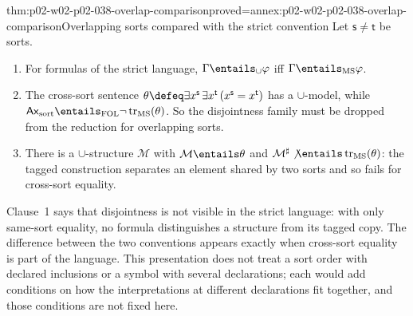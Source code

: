 \begin{hbtheorem}{thm:p02-w02-p02-038-overlap-comparison}{proved=annex:p02-w02-p02-038-overlap-comparison}{Overlapping sorts compared with the strict convention}
Let \(\mathsf s\ne\mathsf t\) be sorts.
\begin{enumerate}
\item For formulas of the strict language, \(\Gamma\entails_{\cup}\varphi\)
      iff \(\Gamma\entails_{\mathrm{MS}}\varphi\).
\item The cross-sort sentence
      \(\theta\defeq\exists x^{\mathsf s}\,\exists x^{\mathsf t}\,
      (x^{\mathsf s}=x^{\mathsf t})\) has a \(\cup\)-model, while
      \(\mathsf{Ax}_{\mathrm{sort}}\entails_{\mathrm{FOL}}
      \neg\operatorname{tr}_{\mathrm{MS}}(\theta)\).  So the disjointness
      family must be dropped from the reduction for overlapping sorts.
\item There is a \(\cup\)-structure \(\mathcal M\) with
      \(\mathcal M\entails\theta\) and
      \(\mathcal M^{\sharp}\not\entails\operatorname{tr}_{\mathrm{MS}}(\theta)\):
      the tagged construction separates an element shared by two sorts and
      so fails for cross-sort equality.
\end{enumerate}
\end{hbtheorem}

Clause~1 says that disjointness is not visible in the strict language: with
only same-sort equality, no formula distinguishes a structure from its tagged
copy.  The difference between the two conventions appears exactly when
cross-sort equality is part of the language.  This presentation does not treat a sort
order with declared inclusions or a symbol with several declarations; each
would add conditions on how the interpretations at different declarations
fit together, and those conditions are not fixed here.

